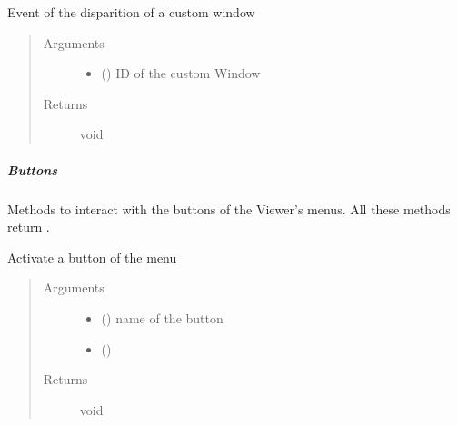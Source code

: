 \documentclass[a4paper,12pt,english]{sphinxmanual}
\begin{document}
\begin{fulllineitems}
\label{\detokenize{viewer/parameters:BIMDataViewer.offCustomWindow}}
Event of the disparition of a custom window
\begin{quote}\begin{description}
\item[{Arguments}] \leavevmode\begin{itemize}
\item {} 
 () \textendash{} ID of the custom Window

\end{itemize}

\item[{Returns}] \leavevmode
void

\end{description}\end{quote}

\end{fulllineitems}



\subparagraph{Buttons}
\label{\detokenize{viewer/parameters:buttons}}
Methods to interact with the buttons of the Viewer’s menus.
All these methods return .


\begin{fulllineitems}
\label{\detokenize{viewer/parameters:BIMDataViewer.activateButtonMenu}}
Activate a button of the menu
\begin{quote}\begin{description}
\item[{Arguments}] \leavevmode\begin{itemize}
\item {} 
 () \textendash{} name of the button

\item {} 
 () \textendash{} 

\end{itemize}

\item[{Returns}] \leavevmode
void

\end{description}\end{quote}

\end{fulllineitems}
\end{document}
